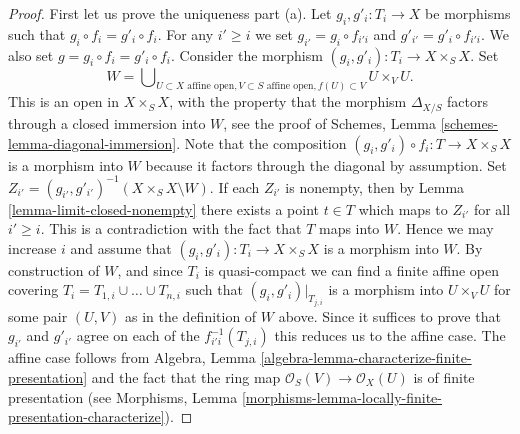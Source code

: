 \begin{proof}
\noindent
First let us prove the uniqueness part (a). Let $g_i, g'_i : T_i \to X$ be
morphisms such that $g_i \circ f_i = g'_i \circ f_i$. For any $i' \geq i$
we set $g_{i'} = g_i \circ f_{i'i}$ and $g'_{i'} = g'_i \circ f_{i'i}$.
We also set $g = g_i \circ f_i = g'_i \circ f_i$.
Consider the morphism
$(g_i, g'_i) : T_i \to X \times_S X$. Set
$$
W =
\bigcup\nolimits_{U \subset X\text{ affine open},
V \subset S\text{ affine open}, f(U) \subset V}
U \times_V U.
$$
This is an open in $X \times_S X$, with the property that the morphism
$\Delta_{X/S}$ factors through a closed immersion into $W$, see the proof
of Schemes, Lemma \ref{schemes-lemma-diagonal-immersion}.
Note that the composition
$(g_i, g'_i) \circ f_i : T \to X \times_S X$ is a morphism into $W$
because it factors through the diagonal by assumption.
Set $Z_{i'} = (g_{i'}, g'_{i'})^{-1}(X \times_S X \setminus W)$.
If each $Z_{i'}$ is nonempty, then by Lemma \ref{lemma-limit-closed-nonempty}
there exists a point $t \in T$ which maps to $Z_{i'}$ for all
$i' \geq i$. This is a contradiction with the fact that $T$ maps into $W$.
Hence we may increase $i$ and assume that $(g_i, g'_i) : T_i \to X \times_S X$
is a morphism into $W$. By construction of $W$, and since $T_i$ is
quasi-compact we can find a finite affine open covering
$T_i = T_{1, i} \cup \ldots \cup T_{n, i}$ such that
$(g_i, g'_i)|_{T_{j, i}}$ is a morphism into $U \times_V U$ for
some pair $(U, V)$ as in the definition of $W$ above.
Since it suffices to prove that $g_{i'}$ and $g'_{i'}$ agree
on each of the $f_{i'i}^{-1}(T_{j, i})$ this reduces us to the affine case.
The affine case follows from
Algebra, Lemma \ref{algebra-lemma-characterize-finite-presentation}
and the fact that the ring map
$\mathcal{O}_S(V) \to \mathcal{O}_X(U)$ is of finite presentation
(see Morphisms,
Lemma \ref{morphisms-lemma-locally-finite-presentation-characterize}).


\end{proof}
